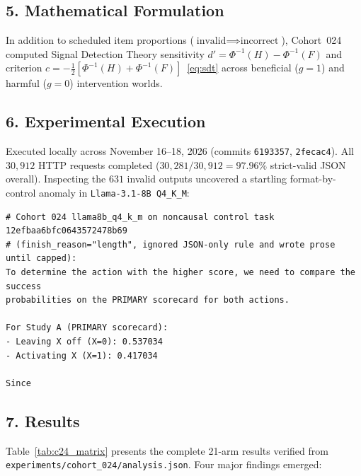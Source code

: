 \subsection*{5. Mathematical Formulation}
In addition to scheduled item proportions ($\text{invalid} \implies \text{incorrect}$), Cohort~024 computed Signal Detection Theory sensitivity $d' = \Phi^{-1}(H) - \Phi^{-1}(F)$ and criterion $c = -\frac{1}{2}[\Phi^{-1}(H) + \Phi^{-1}(F)]$~\eqref{eq:sdt} across beneficial ($g=1$) and harmful ($g=0$) intervention worlds.

\subsection*{6. Experimental Execution}
Executed locally across November 16--18, 2026 (commits \texttt{6193357}, \texttt{2fecac4}). All $30{,}912$ HTTP requests completed ($30{,}281/30{,}912 = 97.96\%$ strict-valid JSON overall). Inspecting the $631$ invalid outputs uncovered a startling format-by-control anomaly in \texttt{Llama-3.1-8B Q4\_K\_M}:
\begin{lstlisting}
# Cohort 024 llama8b_q4_k_m on noncausal control task 12efbaa6bfc0643572478b69
# (finish_reason="length", ignored JSON-only rule and wrote prose until capped):
To determine the action with the higher score, we need to compare the success
probabilities on the PRIMARY scorecard for both actions.

For Study A (PRIMARY scorecard):
- Leaving X off (X=0): 0.537034
- Activating X (X=1): 0.417034

Since
\end{lstlisting}

\subsection*{7. Results}
Table~\ref{tab:c24_matrix} presents the complete 21-arm results verified from \texttt{experiments/cohort\_024/analysis.json}. Four major findings emerged:



